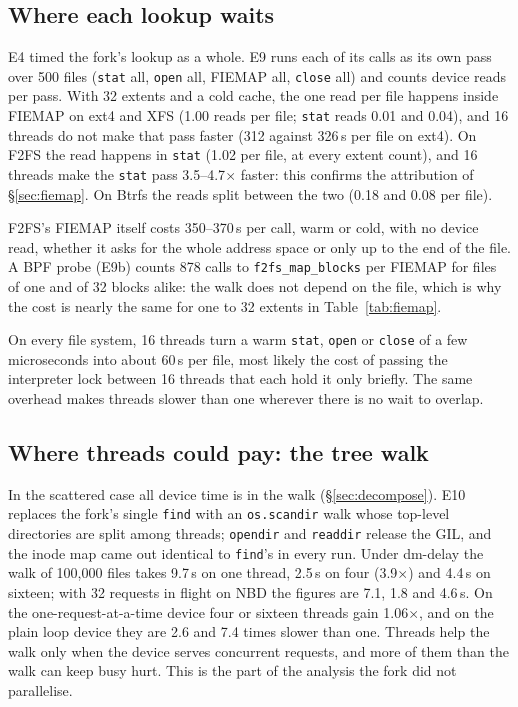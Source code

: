 \subsection{Where each lookup waits}
\label{sec:calls}

E4 timed the fork's lookup as a whole. E9 runs each of its calls as its own pass over
500 files (\texttt{stat} all, \texttt{open} all, FIEMAP all, \texttt{close} all) and
counts device reads per pass. With 32 extents and a cold cache, the one read per file
happens inside FIEMAP on ext4 and XFS (1.00 reads per file; \texttt{stat} reads 0.01 and
0.04), and 16 threads do not make that pass faster (312 against 326\,\textmu s per file
on ext4). On F2FS the read happens in \texttt{stat} (1.02 per file, at every extent
count), and 16 threads make the \texttt{stat} pass 3.5--4.7$\times$ faster: this
confirms the attribution of \S\ref{sec:fiemap}. On Btrfs the reads split between the
two (0.18 and 0.08 per file).

F2FS's FIEMAP itself costs 350--370\,\textmu s per call, warm or cold, with no device
read, whether it asks for the whole address space or only up to the end of the file. A
BPF probe (E9b) counts 878 calls to \texttt{f2fs\_map\_blocks} per FIEMAP for files of
one and of 32 blocks alike: the walk does not depend on the file, which is why the cost
is nearly the same for one to 32 extents in Table~\ref{tab:fiemap}.

On every file system, 16 threads turn a warm \texttt{stat}, \texttt{open} or
\texttt{close} of a few microseconds into about 60\,\textmu s per file, most likely the
cost of passing the interpreter lock between 16 threads that each hold it only briefly.
The same overhead makes threads slower than one wherever there is no wait to overlap.

\subsection{Where threads could pay: the tree walk}
\label{sec:walk}

In the scattered case all device time is in the walk (\S\ref{sec:decompose}). E10
replaces the fork's single \texttt{find} with an \texttt{os.scandir} walk whose
top-level directories are split among threads; \texttt{opendir} and \texttt{readdir}
release the GIL, and the inode map came out identical to \texttt{find}'s in every run.
Under dm-delay the walk of 100{,}000 files takes 9.7\,s on one thread, 2.5\,s on four
(3.9$\times$) and 4.4\,s on sixteen; with 32 requests in flight on NBD the figures are
7.1, 1.8 and 4.6\,s. On the one-request-at-a-time device four or sixteen threads gain
1.06$\times$, and on the plain loop device they are 2.6 and 7.4 times slower than one.
Threads help the walk only when the device serves concurrent requests, and more of
them than the walk can keep busy hurt. This is the part of the analysis the fork did
not parallelise.

